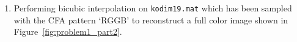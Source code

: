 \documentclass[11pt, a4]{article}
\begin{document}
\begin{enumerate}
\begin{enumerate}
			\item Performing bicubic interpolation on \texttt{kodim19.mat} which has been sampled
			with the CFA pattern ‘RGGB’ to reconstruct a full color image shown in Figure~\ref{fig:problem1_part2}.
			\begin{figure}[h]
				\centering
\end{figure}
\end{enumerate}
\end{enumerate}
\end{document}
